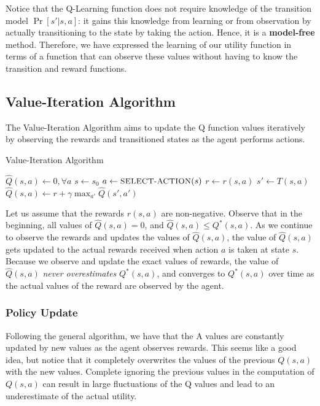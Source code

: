 \documentclass[12pt]{article}
\begin{document}
Notice that the Q-Learning function does not require knowledge of the transition model $\Pr[s' | s, a]$: it gains this knowledge from learning or from observation by actually transitioning to the state by taking the action. Hence, it is a \textbf{model-free} method. Therefore, we have expressed the learning of our utility function in terms of a function that can observe these values without having to know the transition and reward functions.

\subsection{Value-Iteration Algorithm}

The Value-Iteration Algorithm aims to update the Q function values iteratively by observing the rewards and transitioned states as the agent performs actions. 

\begin{algorithm}
\caption{Value-Iteration Algorithm}\label{euclid}
\begin{algorithmic}[1]
\State $\hat{Q}(s,a) \leftarrow 0, \forall a$
\State $s \leftarrow s_0$ 
	\State $a \leftarrow \small{\textsc{SELECT-ACTION}}(s)$
	\State $r \leftarrow r(s, a)$
	\State $s' \leftarrow T(s, a)$
	\State $\hat{Q}(s, a) \leftarrow r + \gamma \max_{a'} \hat{Q}(s', a')$
\EndFor
\end{algorithmic}
\end{algorithm}

Let us assume that the rewards $r(s, a)$ are non-negative. Observe that in the beginning, all values of $\hat{Q}(s, a) = 0$, and $\hat{Q}(s, a) \leq Q^*(s, a)$. As we continue to observe the rewards and updates the values of $\hat{Q}(s, a)$, the value of $\hat{Q}(s, a)$ gets updated to the actual rewards received when action $a$ is taken at state $s$. Because we observe and update the exact values of rewards, the value of $\hat{Q}(s, a)$ \textit{never overestimates} $Q^*(s, a)$, and converges to $Q^*(s, a)$ over time as the actual values of the reward are observed by the agent.

\subsubsection{Policy Update}

Following the general algorithm, we have that the A values are constantly updated by new values as the agent observes rewards. This seems like a good idea, but notice that it completely overwrites the values of the previous $Q(s, a)$ with the new values. Complete ignoring the previous values in the computation of $Q(s, a)$ can result in large fluctuations of the Q values and lead to an underestimate of the actual utility.\\
\end{document}
